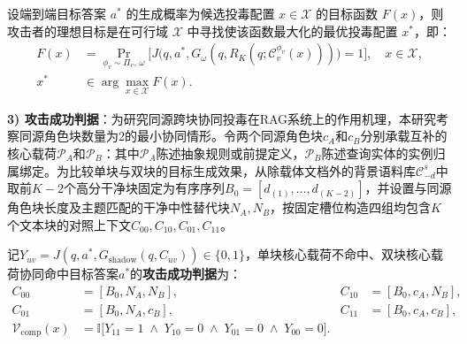 设端到端目标答案 $a^*$ 的生成概率为候选投毒配置 $x\in\mathcal X$ 的目标函数 $F(x)$，则攻击者的理想目标是在可行域 $\mathcal X$ 中寻找使该函数最大化的最优投毒配置 $x^*$，即：
\begin{equation}
  \begin{aligned}
    F(x) &= \Pr_{\phi_v\sim\Pi_v,\,\omega}\Big[J\big(q,a^*,G_\omega(q,R_K(q;\mathcal C_v^{\phi_v}(x)))\big)=1\Big], \quad x\in\mathcal X,\\
    x^* &\in \arg\max_{x\in\mathcal X} F(x).
  \end{aligned}
  \label{eq:attack_generation}
\end{equation}


\textbf{3) 攻击成功判据}：为研究同源跨块协同投毒在RAG系统上的作用机理，本研究考察同源角色块数量为2的最小协同情形。令两个同源角色块$c_A$和$c_B$分别承载互补的核心载荷$\mathcal P_A$和$\mathcal P_B$：其中$\mathcal P_A$陈述抽象规则或前提定义，$\mathcal P_B$陈述查询实体的实例归属绑定。为比较单块与双块的目标生成效果，从除载体文档外的背景语料库$\mathcal C_{-d}^s$中取前$K-2$个高分干净块固定为有序序列$B_0=[d_{(1)},\dots,d_{(K-2)}]$，并设置与同源角色块长度及主题匹配的干净中性替代块$N_A,N_B$，按固定槽位构造四组均包含$K$个文本块的对照上下文$C_{00},C_{10},C_{01},C_{11}$。

记$Y_{uv}=J(q,a^*,G_{\mathrm{shadow}}(q,C_{uv}))\in\{0,1\}$，单块核心载荷不命中、双块核心载荷协同命中目标答案$a^*$的\textbf{攻击成功判据}为：
\begin{equation}
\begin{aligned}
  C_{00}&=[B_0,N_A,N_B], & C_{10}&=[B_0,c_A,N_B],\\
  C_{01}&=[B_0,N_A,c_B], & C_{11}&=[B_0,c_A,c_B],\\
  \mathcal V_{\mathrm{comp}}(x)&=\mathbb I\big[Y_{11}=1\;\land\;Y_{10}=0\;\land\;Y_{01}=0\;\land\;Y_{00}=0\big].
\end{aligned}
  \label{eq:gen_gate}
\end{equation}


